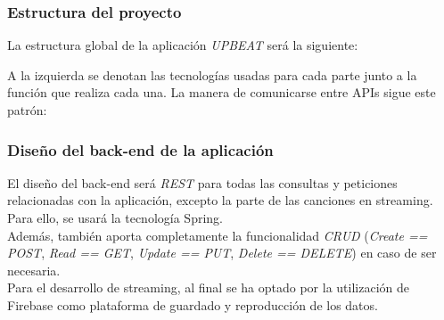 \documentclass{article}
\begin{document}
\subsubsection{Estructura del proyecto}
La estructura global de la aplicación \textit{UPBEAT} será la siguiente:
\begin{figure}[H]
	\hspace*{-1.5cm}
\end{figure}
A la izquierda se denotan las tecnologías usadas para cada parte junto a la función que realiza cada una.
\newpage
La manera de comunicarse entre APIs sigue este patrón:
\begin{figure}[H]
\end{figure}
\subsubsection{Diseño del back-end de la aplicación}
El diseño del back-end será \textit{REST} para todas las consultas y peticiones relacionadas con la aplicación, excepto la parte de las canciones en streaming. Para ello, se usará la tecnología Spring. \\
\hfill \break
Además, también aporta completamente la funcionalidad \textit{CRUD} (\textit{Create == POST}, \textit{Read == GET}, \textit{Update == PUT}, \textit{Delete == DELETE}) en caso de ser necesaria.\\
\hfill \break
Para el desarrollo de streaming, al final se ha optado por la utilización de Firebase como plataforma de guardado y reproducción de los datos.
\end{document}
